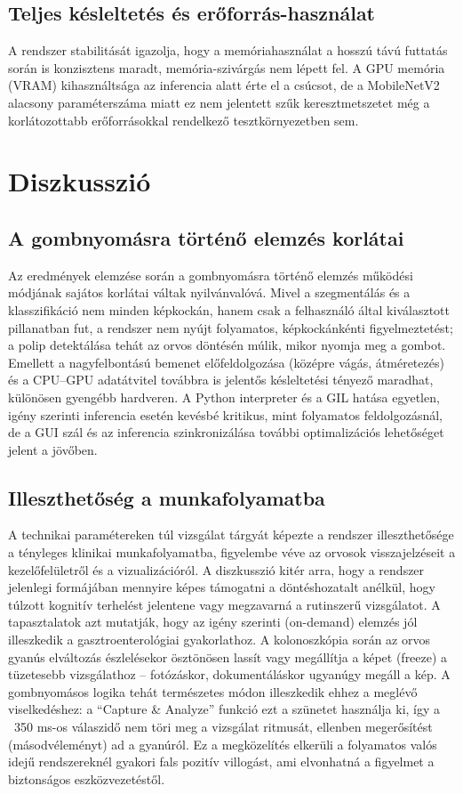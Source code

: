 \documentclass[12pt, a4paper]{report}
\begin{document}
\subsection{Teljes késleltetés és erőforrás-használat}
A rendszer stabilitását igazolja, hogy a memóriahasználat a hosszú távú futtatás során is konzisztens maradt, memória-szivárgás nem lépett fel. A GPU memória (VRAM) kihasználtsága az inferencia alatt érte el a csúcsot, de a MobileNetV2 alacsony paraméterszáma miatt ez nem jelentett szűk keresztmetszetet még a korlátozottabb erőforrásokkal rendelkező tesztkörnyezetben sem.

\section{Diszkusszió}

\subsection{A gombnyomásra történő elemzés korlátai}
Az eredmények elemzése során a gombnyomásra történő elemzés működési módjának sajátos korlátai váltak nyilvánvalóvá. Mivel a szegmentálás és a klasszifikáció nem minden képkockán, hanem csak a felhasználó által kiválasztott pillanatban fut, a rendszer nem nyújt folyamatos, képkockánkénti figyelmeztetést; a polip detektálása tehát az orvos döntésén múlik, mikor nyomja meg a gombot. Emellett a nagyfelbontású bemenet előfeldolgozása (középre vágás, átméretezés) és a CPU--GPU adatátvitel továbbra is jelentős késleltetési tényező maradhat, különösen gyengébb hardveren. A Python interpreter és a GIL hatása egyetlen, igény szerinti inferencia esetén kevésbé kritikus, mint folyamatos feldolgozásnál, de a GUI szál és az inferencia szinkronizálása további optimalizációs lehetőséget jelent a jövőben.

\subsection{Illeszthetőség a munkafolyamatba}
A technikai paramétereken túl vizsgálat tárgyát képezte a rendszer illeszthetősége a tényleges klinikai munkafolyamatba, figyelembe véve az orvosok visszajelzéseit a kezelőfelületről és a vizualizációról. A diszkusszió kitér arra, hogy a rendszer jelenlegi formájában mennyire képes támogatni a döntéshozatalt anélkül, hogy túlzott kognitív terhelést jelentene vagy megzavarná a rutinszerű vizsgálatot. A tapasztalatok azt mutatják, hogy az igény szerinti (on-demand) elemzés jól illeszkedik a gasztroenterológiai gyakorlathoz. A kolonoszkópia során az orvos gyanús elváltozás észlelésekor ösztönösen lassít vagy megállítja a képet (freeze) a tüzetesebb vizsgálathoz – fotózáskor, dokumentáláskor ugyanúgy megáll a kép. A gombnyomásos logika tehát természetes módon illeszkedik ehhez a meglévő viselkedéshez: a ``Capture \& Analyze'' funkció ezt a szünetet használja ki, így a ~350 ms-os válaszidő nem töri meg a vizsgálat ritmusát, ellenben megerősítést (másodvéleményt) ad a gyanúról. Ez a megközelítés elkerüli a folyamatos valós idejű rendszereknél gyakori fals pozitív villogást, ami elvonhatná a figyelmet a biztonságos eszközvezetéstől.
\end{document}
